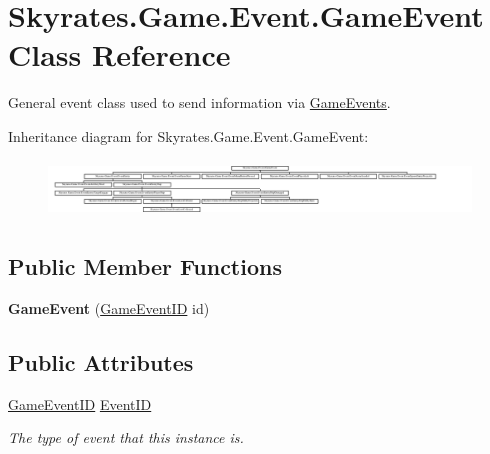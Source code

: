 \hypertarget{class_skyrates_1_1_game_1_1_event_1_1_game_event}{\section{Skyrates.\-Game.\-Event.\-Game\-Event Class Reference}
\label{class_skyrates_1_1_game_1_1_event_1_1_game_event}
}


General event class used to send information via \hyperlink{class_skyrates_1_1_game_1_1_event_1_1_game_events}{Game\-Events}.  


Inheritance diagram for Skyrates.\-Game.\-Event.\-Game\-Event\-:\begin{figure}[H]
\begin{center}
\leavevmode
\includegraphics[height=1.518987cm]{class_skyrates_1_1_game_1_1_event_1_1_game_event}
\end{center}
\end{figure}
\subsection*{Public Member Functions}
\begin{DoxyCompactItemize}
\item 
\hypertarget{class_skyrates_1_1_game_1_1_event_1_1_game_event_af1a5a53e95e22845aa9050aefbf00a95}{{\bfseries Game\-Event} (\hyperlink{namespace_skyrates_1_1_game_1_1_event_ad31565d2f03f234f8f77ebf23ff8f150}{Game\-Event\-I\-D} id)}\label{class_skyrates_1_1_game_1_1_event_1_1_game_event_af1a5a53e95e22845aa9050aefbf00a95}

\end{DoxyCompactItemize}
\subsection*{Public Attributes}
\begin{DoxyCompactItemize}
\item 
\hyperlink{namespace_skyrates_1_1_game_1_1_event_ad31565d2f03f234f8f77ebf23ff8f150}{Game\-Event\-I\-D} \hyperlink{class_skyrates_1_1_game_1_1_event_1_1_game_event_ad403f445789c2415602f1bef7fbc4c4f}{Event\-I\-D}
\begin{DoxyCompactList}\small\item\em The type of event that this instance is. \end{DoxyCompactList}\end{DoxyCompactItemize}


